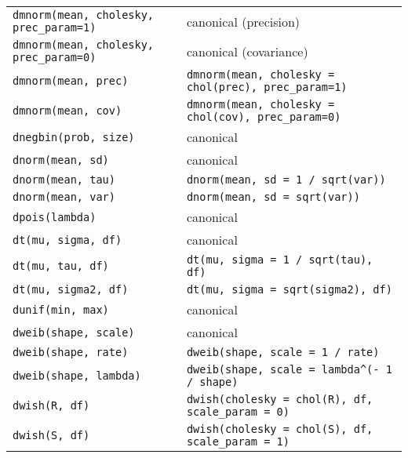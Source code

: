 \begin{center}
\begin{longtable}{ll}
     \texttt{dmnorm(mean, cholesky, prec\_param=1)} & canonical (precision) \\
     \texttt{dmnorm(mean, cholesky, prec\_param=0)} & canonical (covariance) \\
     \texttt{dmnorm(mean, prec)} & \texttt{dmnorm(mean, cholesky = chol(prec), prec\_param=1)} \\
     \texttt{dmnorm(mean, cov)} & \texttt{dmnorm(mean, cholesky = chol(cov), prec\_param=0)} \\
   \texttt{dnegbin(prob, size)} & canonical \\
     \texttt{dnorm(mean, sd)} & canonical \\
     \texttt{dnorm(mean, tau)} & \verb|dnorm(mean, sd = 1 / sqrt(var))| \\
     \texttt{dnorm(mean, var)} & \texttt{dnorm(mean, sd = sqrt(var))} \\
     \texttt{dpois(lambda)} & canonical \\
     \texttt{dt(mu, sigma, df)} & canonical \\
    \texttt{dt(mu, tau, df)} & \verb|dt(mu, sigma = 1 / sqrt(tau), df)| \\
    \texttt{dt(mu, sigma2, df)} & \verb|dt(mu, sigma = sqrt(sigma2), df)| \\
   \texttt{dunif(min, max)} & canonical \\
     \texttt{dweib(shape, scale)} & canonical \\
     \texttt{dweib(shape, rate)} & \verb|dweib(shape, scale = 1 / rate)| \\
     \texttt{dweib(shape, lambda)} & \verb|dweib(shape, scale = lambda^(- 1 / shape)| \\
     \texttt{dwish(R, df)} & \texttt{dwish(cholesky = chol(R), df, scale\_param = 0)}\\ 
     \texttt{dwish(S, df)} & \texttt{dwish(cholesky = chol(S), df, scale\_param = 1)}\\ 
     \end{longtable}
  \end{center}
